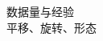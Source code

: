 \documentclass{beamer}%
\begin{document}
\begin{frame}
\vspace{0.2cm}

数据量与经验\\
平移、旋转、形态


\end{frame}


\begin{frame}


%
%
%
%


\end{frame}
\end{document}
